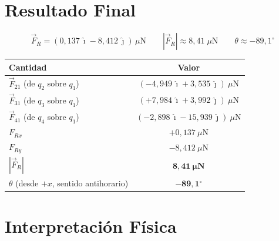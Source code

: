 \documentclass[12pt,letterpaper]{article}
\begin{document}
\section*{Resultado Final}

\begin{equation*}
\boxed{
\vec{F}_R = \left(0{,}137\,\hat{\imath} - 8{,}412\,\hat{\jmath}\right)\,\mu\text{N}
\qquad
|\vec{F}_R| \approx 8{,}41\;\mu\text{N}
\qquad
\theta \approx -89{,}1^\circ
}
\end{equation*}

\begin{center}
\begin{tabular}{|l|c|}
\hline
\textbf{Cantidad} & \textbf{Valor} \\
\hline\hline
$\vec{F}_{21}$ (de $q_2$ sobre $q_1$) & $(-4{,}949\,\hat{\imath} + 3{,}535\,\hat{\jmath})\ \mu\text{N}$ \\
\hline
$\vec{F}_{31}$ (de $q_3$ sobre $q_1$) & $(+7{,}984\,\hat{\imath} + 3{,}992\,\hat{\jmath})\ \mu\text{N}$ \\
\hline
$\vec{F}_{41}$ (de $q_4$ sobre $q_1$) & $(-2{,}898\,\hat{\imath} - 15{,}939\,\hat{\jmath})\ \mu\text{N}$ \\
\hline
$F_{Rx}$ & $+0{,}137\ \mu\text{N}$ \\
\hline
$F_{Ry}$ & $-8{,}412\ \mu\text{N}$ \\
\hline
$|\vec{F}_R|$ & $\mathbf{8{,}41\ \mu\text{N}}$ \\
\hline
$\theta$ (desde $+x$, sentido antihorario) & $\mathbf{-89{,}1^\circ}$ \\
\hline
\end{tabular}
\end{center}

\section*{Interpretaci\'on F\'isica}
\end{document}
